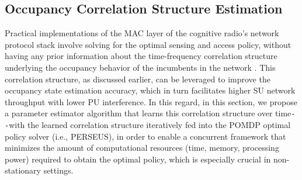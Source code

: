 \documentclass[12pt, draftcls, onecolumn]{IEEEtran}
\begin{document}
\subsection{Occupancy Correlation Structure Estimation}\label{II.I}
Practical implementations of the MAC layer of the cognitive radio's network protocol stack involve solving for the optimal sensing and access policy, without having any prior information about the time-frequency correlation structure underlying the occupancy behavior of the incumbents in the network . This correlation structure, as discussed earlier, can be leveraged to improve the occupancy state estimation accuracy, which in turn facilitates higher SU network throughput with lower PU interference. In this regard, in this section, we propose a parameter estimator algorithm that learns this correlation structure over time\texttt{-{}-}with the learned correlation structure iteratively fed into the POMDP optimal policy solver (i.e., PERSEUS), in order to enable a concurrent framework that minimizes the amount of computational resources (time, memory, processing power) required to obtain the optimal policy, which is especially crucial in non-stationary settings.
\end{document}
